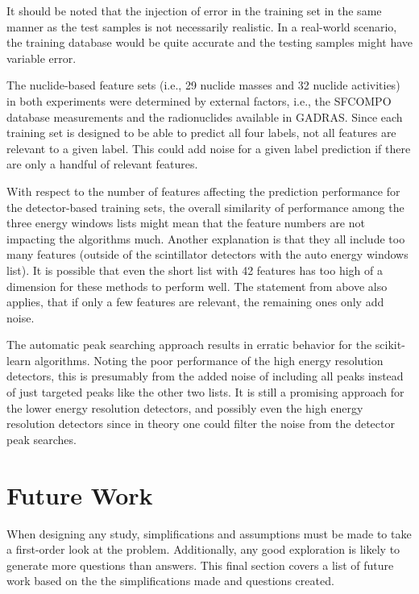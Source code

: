 It should be noted that the injection of error in the training set in the same
manner as the test samples is not necessarily realistic. In a real-world
scenario, the training database would be quite accurate and the testing samples
might have variable error. 

The nuclide-based feature sets (i.e., 29 nuclide masses and 32 nuclide
activities) in both experiments were determined by external factors, i.e., the
\gls{SFCOMPO} database measurements and the radionuclides available in
\gls{GADRAS}.  Since each training set is designed to be able to predict all
four labels, not all features are relevant to a given label. This could add
noise for a given label prediction if there are only a handful of relevant
features. 

With respect to the number of features affecting the prediction performance for
the detector-based training sets, the overall similarity of performance among
the three energy windows lists might mean that the feature numbers are not
impacting the algorithms much.  Another explanation is that they all include
too many features (outside of the scintillator detectors with the auto energy
windows list).  It is possible that even the short list with 42 features has
too high of a dimension for these methods to perform well. The statement from
above also applies, that if only a few features are relevant, the remaining
ones only add noise. 

The automatic peak searching approach results in erratic behavior for the
scikit-learn algorithms. Noting the poor performance of the high energy
resolution detectors, this is presumably from the added noise of including all
peaks instead of just targeted peaks like the other two lists.  It is still a
promising approach for the lower energy resolution detectors, and possibly even
the high energy resolution detectors since in theory one could filter the noise
from the detector peak searches. 

\section{Future Work}
\label{sec:future}

When designing any study, simplifications and assumptions must be made to take
a first-order look at the problem. Additionally, any good exploration is likely
to generate more questions than answers. This final section covers a list of
future work based on the the simplifications made and questions created.

